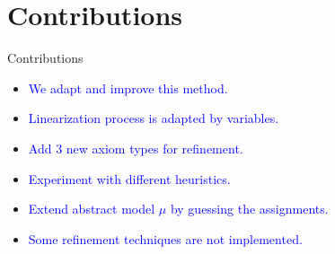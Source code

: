 \documentclass[]{beamer}
\begin{document}
\section{Contributions}
\begin{frame}{Contributions}
    \begin{itemize}
        \item \textcolor<1>{blue}{We adapt and improve this method.}
        \item \textcolor<2>{blue}{Linearization process is adapted by variables.}
		\item \textcolor<3>{blue}{Add 3 new axiom types for refinement.}
		\item \textcolor<4>{blue}{Experiment with different heuristics.}
    \end{itemize}
    \bigskip
    \bigskip
    \begin{itemize}
        \item \textcolor<5>{blue}{Extend abstract model $\hat{\mu}$ by guessing the assignments.}
		\item \textcolor<6>{blue}{Some refinement techniques are not implemented.}
    \end{itemize}
\end{frame}
\end{document}

